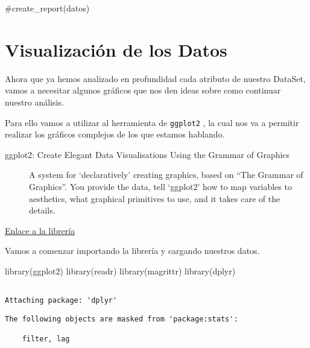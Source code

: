 \documentclass[
  letterpaper,
  DIV=11,
  numbers=noendperiod]{scrreprt}
\newenvironment{Shaded}{\begin{snugshade}}{\end{snugshade}}
\newcommand{\CommentTok}[1]{\textcolor[rgb]{0.37,0.37,0.37}{#1}}
\newcommand{\FunctionTok}[1]{\textcolor[rgb]{0.28,0.35,0.67}{#1}}
\newcommand{\NormalTok}[1]{\textcolor[rgb]{0.00,0.23,0.31}{#1}}
\begin{document}
\begin{Shaded}
\begin{Highlighting}[]
\CommentTok{\#create\_report(datos)}
\end{Highlighting}
\end{Shaded}


\chapter{Visualización de los
Datos}\label{visualizaciuxf3n-de-los-datos}

Ahora que ya hemos analizado en profundidad cada atributo de nuestro
DataSet, vamos a necesitar algunos gráficos que nos den ideas sobre como
continuar nuestro análisis.

Para ello vamos a utilizar al herramienta de \texttt{ggplot2} , la cual
nos va a permitir realizar los gráficos complejos de los que estamos
hablando.

\begin{description}
\item[ggplot2: Create Elegant Data Visualisations Using the Grammar of
Graphics]
A system for `declaratively' creating graphics, based on ``The Grammar
of Graphics''. You provide the data, tell `ggplot2' how to map variables
to aesthetics, what graphical primitives to use, and it takes care of
the details.
\end{description}

\href{https://ggplot2.tidyverse.org/}{Enlace a la librería}

Vamos a comenzar importando la librería y cargando nuestros datos.

\begin{Shaded}
\begin{Highlighting}[]
\FunctionTok{library}\NormalTok{(ggplot2)}
\FunctionTok{library}\NormalTok{(readr) }
\FunctionTok{library}\NormalTok{(magrittr)}
\FunctionTok{library}\NormalTok{(dplyr)}
\end{Highlighting}
\end{Shaded}

\begin{verbatim}

Attaching package: 'dplyr'
\end{verbatim}

\begin{verbatim}
The following objects are masked from 'package:stats':

    filter, lag
\end{verbatim}
\end{document}
